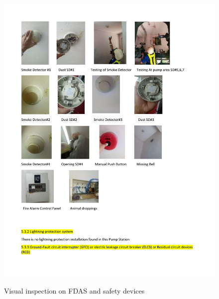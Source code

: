 \begin{figure}
	\includegraphics[scale=1]{figures/ch04_fig_fdas03} \\
	\caption{Visual inspection on FDAS and safety devices}
	\label{ch04_fig_fdas03} 
\end{figure}